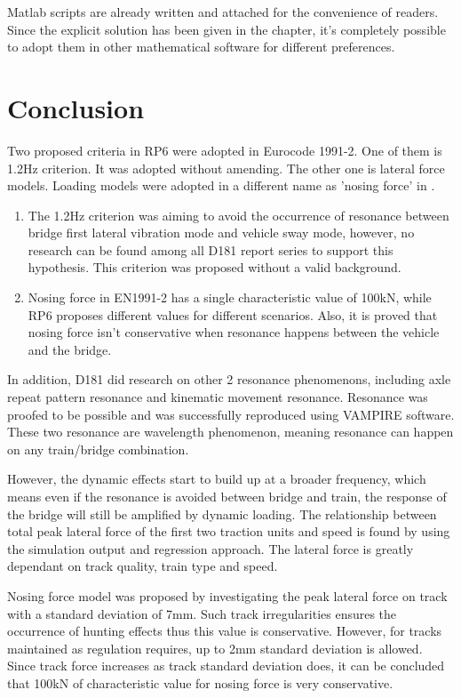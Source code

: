 Matlab scripts are already written and attached for the convenience of readers. Since the explicit solution has been given in the chapter, it's completely possible to adopt them in other mathematical software for different preferences.

\chapter{Conclusion}


Two proposed criteria in RP6\citet{d181} were adopted in Eurocode 1991-2. One of them is 1.2Hz criterion. It was adopted without amending. The other one is lateral force models. Loading models were adopted in a different name as 'nosing force' in \citet[A6.5.2]{EC12}. 

\begin{enumerate}[-]
\item The 1.2Hz criterion was aiming to avoid the occurrence of resonance between bridge first lateral vibration mode and vehicle sway mode, however, no research can be found among all D181 report series to support this hypothesis. This criterion was proposed without a valid background.

\item Nosing force in EN1991-2 has a single characteristic value of 100kN, while RP6 proposes different values for different scenarios. Also, it is proved that nosing force isn't conservative when resonance happens between the vehicle and the bridge.
\end{enumerate}

In addition, D181 did research on other 2 resonance phenomenons, including axle repeat pattern resonance and kinematic movement resonance. Resonance was proofed to be possible and was successfully reproduced using VAMPIRE software. These two resonance are wavelength phenomenon, meaning resonance can happen on any train/bridge combination.

However, the dynamic effects start to build up at a broader frequency, which means even if the resonance is avoided between bridge and train, the response of the bridge will still be amplified by dynamic loading. The relationship between total peak lateral force of the first two traction units and speed is found by using the simulation output and regression approach. The lateral force is greatly dependant on track quality, train type and speed.

Nosing force model was proposed by investigating the peak lateral force on track with a standard deviation of 7mm. Such track irregularities ensures the occurrence of hunting effects thus this value is conservative. However, for tracks maintained as regulation requires, up to 2mm standard deviation is allowed. Since track force increases as track standard deviation does, it can be concluded that 100kN of characteristic value for nosing force is very conservative.

